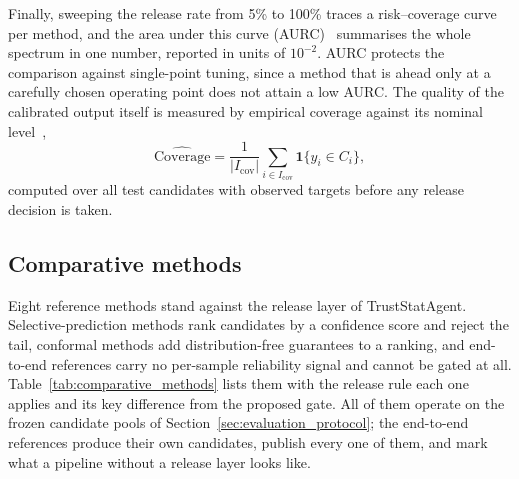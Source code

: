 \documentclass[preprint,12pt,authoryear]{elsarticle}
\begin{document}
Finally, sweeping the release rate from 5\% to 100\% traces a risk--coverage curve~\citep{elyaniv2010foundations} per method, and the area under this curve (AURC)~\citep{geifman2017selective} summarises the whole spectrum in one number, reported in units of $10^{-2}$.
AURC protects the comparison against single-point tuning, since a method that is ahead only at a carefully chosen operating point does not attain a low AURC.
The quality of the calibrated output itself is measured by empirical coverage against its nominal level~\citep{angelopoulos2023gentle},
\begin{equation}
    \widehat{\mathrm{Coverage}}
    =
    \frac{1}{|I_{\mathrm{cov}}|}
    \sum_{i\in I_{\mathrm{cov}}}
    \mathbf{1}\{y_i\in C_i\},
    \label{eq:exp_coverage}
\end{equation}
computed over all test candidates with observed targets before any release decision is taken.


\subsection{Comparative methods}
\label{sec:comparative_methods}


Eight reference methods stand against the release layer of TrustStatAgent. Selective-prediction methods rank candidates by a confidence score and reject the tail, conformal methods add distribution-free guarantees to a ranking, and end-to-end references carry no per-sample reliability signal and cannot be gated at all.
Table~\ref{tab:comparative_methods} lists them with the release rule each one applies and its key difference from the proposed gate.
All of them operate on the frozen candidate pools of Section~\ref{sec:evaluation_protocol}; the end-to-end references produce their own candidates, publish every one of them, and mark what a pipeline without a release layer looks like.
\end{document}
